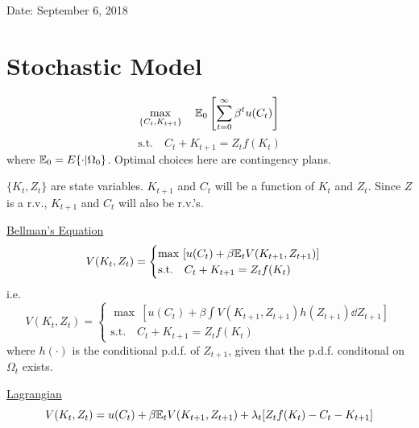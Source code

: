 \documentclass[twoside]{article}
\newcommand\lsb{\left [}
\newcommand\rsb{\right ]}
\newcommand\lcb{\left \{}
\newcommand\rcb{\right \}}
\begin{document}

\hfill Date: September 6, 2018

\section{Stochastic Model}
\begin{equation}
    \max\limits_{\lcb C_t, K_{t+1} \rcb} \quad \E_{0} \lsb \sum_{t=0}^{\infty} \beta^{t} u(C_{t})  \rsb 
\end{equation}
\begin{equation}
    \text{s.t.} \quad C_t + K_{t+1} = Z_{t}f(K_{t})
\end{equation}
where $\mathbb{E}_{0} = E \{ \cdot | \Omega_{0} \}$. Optimal choices here are contingency plans.

$\{ K_{t}, Z_{t} \}$ are state variables. $K_{t+1}$ and $C_{t}$ will be a function of $K_{t}$ and $Z_{t}$. Since $Z$ is a r.v., $K_{t+1}$ and $C_t$ will also be r.v.'s.

\underline{Bellman's Equation}
\begin{equation}
    V(K_{t}, Z_{t}) = \begin{cases}
        \max ~ [u(C_{t}) + \beta \mathbb{E}_t V(K_{t+1}, Z_{t+1})]\\
        \text{s.t.} \quad C_{t} + K_{t+1} = Z_{t} f(K_{t})
    \end{cases}
\end{equation}
i.e.
\begin{equation}
    V(K_{t}, Z_{t}) = \begin{cases}
        \max ~ [u(C_{t}) + \beta \int V(K_{t+1}, Z_{t+1}) h(Z_{t+1}) \dd Z_{t+1}]\\
        \text{s.t.} \quad C_{t} + K_{t+1} = Z_{t} f(K_{t})
    \end{cases}
\end{equation}
where $h(\cdot)$ is the conditional p.d.f. of $Z_{t+1}$, given that the p.d.f. conditonal on $\Omega_{t}$ exists.

\underline{Lagrangian}
\begin{equation}
    V(K_{t}, Z_{t}) = u(C_{t}) + \beta \mathbb{E}_t V(K_{t+1}, Z_{t+1}) + \lambda_{t} [Z_{t} f(K_{t}) - C_{t} - K_{t+1}]
\end{equation}
\end{document}
